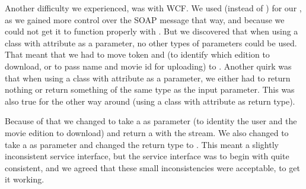 Another difficulty we experienced, was with WCF. We used  (instead of ) for our , as we gained more control over the SOAP message that way, and because we could not get it to function properly with . But we discovered that when using a class with  attribute as a parameter, no other types of parameters could be used. That meant that we had to move token and  (to identify which edition to download, or to pass name and movie id for uploading) to . Another quirk was that when using a class with  attribute as a parameter, we either had to return nothing or return something of the same type as the input parameter. This was also true for the other way around (using a class with  attribute as return type).

Because of that we changed  to take a   as parameter (to identity the user and the movie edition to download) and return a   with the stream. We also changed  to take a  as parameter and changed the return type to . This meant a slightly inconsistent service interface, but the service interface was to begin with quite consistent, and we agreed that these small inconsistencies were acceptable, to get it working.
